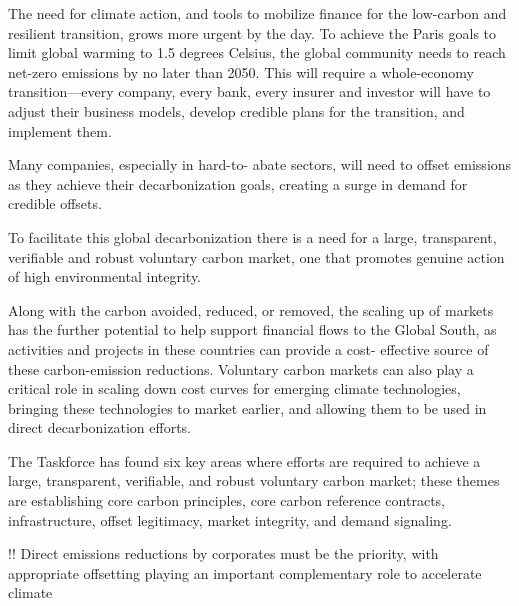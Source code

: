 \documentclass[
]{book}
\begin{document}
The need for climate action, and tools to
mobilize finance for the low-carbon and
resilient transition, grows more urgent by the
day. To achieve the Paris goals to limit global
warming to 1.5 degrees Celsius, the global
community needs to reach net-zero emissions
by no later than 2050. This will require a
whole-economy transition---every company,
every bank, every insurer and investor
will have to adjust their business models,
develop credible plans for the transition, and
implement them.

Many companies, especially in hard-to-
abate sectors, will need to offset emissions
as they achieve their decarbonization goals,
creating a surge in demand for credible
offsets.

To facilitate this global
decarbonization there is a need for a large,
transparent, verifiable and robust voluntary
carbon market, one that promotes genuine
action of high environmental integrity.

Along with the carbon avoided, reduced, or
removed, the scaling up of markets has the
further potential to help support financial
flows to the Global South, as activities and
projects in these countries can provide a cost-
effective source of these carbon-emission
reductions. Voluntary carbon markets can
also play a critical role in scaling down cost
curves for emerging climate technologies,
bringing these technologies to market earlier,
and allowing them to be used in direct
decarbonization efforts.

The Taskforce has found
six key areas where efforts are required
to achieve a large, transparent, verifiable,
and robust voluntary carbon market;
these themes are establishing core carbon
principles, core carbon reference contracts,
infrastructure, offset legitimacy, market
integrity, and demand signaling.

!! Direct
emissions reductions by corporates must
be the priority, with appropriate offsetting
playing an important complementary role
to accelerate climate
\end{document}
